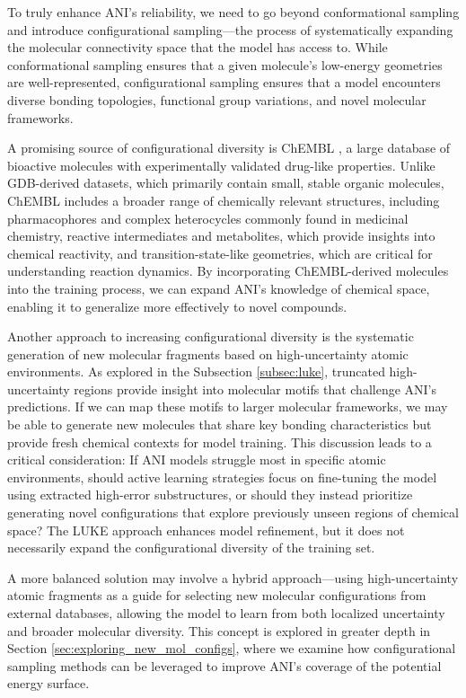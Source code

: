 To truly enhance ANI’s reliability, we need to go beyond conformational sampling and introduce configurational sampling—the process of systematically expanding the molecular connectivity space that the model has access to. 
While conformational sampling ensures that a given molecule’s low-energy geometries are well-represented, configurational sampling ensures that a model encounters diverse bonding topologies, functional group variations, and novel molecular frameworks.

A promising source of configurational diversity is ChEMBL \cite{ChEMBL_gaulton}, a large database of bioactive molecules with experimentally validated drug-like properties. 
Unlike GDB-derived datasets, which primarily contain small, stable organic molecules, ChEMBL includes a broader range of chemically relevant structures, including pharmacophores and complex heterocycles commonly found in medicinal chemistry, reactive intermediates and metabolites, which provide insights into chemical reactivity, and transition-state-like geometries, which are critical for understanding reaction dynamics. 
By incorporating ChEMBL-derived molecules into the training process, we can expand ANI’s knowledge of chemical space, enabling it to generalize more effectively to novel compounds.

Another approach to increasing configurational diversity is the systematic generation of new molecular fragments based on high-uncertainty atomic environments. 
As explored in the Subsection \ref{subsec:luke}, truncated high-uncertainty regions provide insight into molecular motifs that challenge ANI’s predictions. 
If we can map these motifs to larger molecular frameworks, we may be able to generate new molecules that share key bonding characteristics but provide fresh chemical contexts for model training.
This discussion leads to a critical consideration: If ANI models struggle most in specific atomic environments, should active learning strategies focus on fine-tuning the model using extracted high-error substructures, or should they instead prioritize generating novel configurations that explore previously unseen regions of chemical space? 
The LUKE approach enhances model refinement, but it does not necessarily expand the configurational diversity of the training set.

A more balanced solution may involve a hybrid approach—using high-uncertainty atomic fragments as a guide for selecting new molecular configurations from external databases, allowing the model to learn from both localized uncertainty and broader molecular diversity. This concept is explored in greater depth in Section \ref{sec:exploring_new_mol_configs}, where we examine how configurational sampling methods can be leveraged to improve ANI’s coverage of the potential energy surface.

